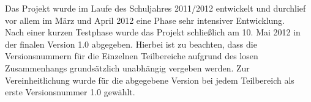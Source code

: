 Das Projekt wurde im Laufe des Schuljahres 2011/2012 entwickelt und durchlief vor allem im März und April 2012 eine Phase sehr intensiver Entwicklung.\\
Nach einer kurzen Testphase wurde das Projekt schließlich am 10. Mai 2012 in der finalen Version 1.0 abgegeben. Hierbei ist zu beachten, dass die Versionsnummern für die Einzelnen Teilbereiche aufgrund des losen Zusammenhangs grundsätzlich unabhängig vergeben werden. Zur Vereinheitlichung wurde für die abgegebene Version bei jedem Teilbereich als erste Versionsnummer 1.0 gewählt. 
